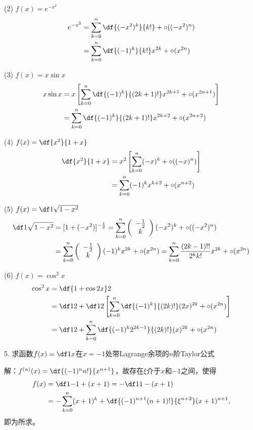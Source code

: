 (2) $f(x)=e^{-x^2}$
\begin{align}
	e^{-x^2}&=\sum\limits_{k=0}^n\df{(-x^2)^k}{k!}+\circ((-x^2)^n)\notag\\
	&=\sum\limits_{k=0}^n\df{(-1)^k}{k!}x^{2k}+\circ(x^{2n})\notag
\end{align}

(3) $f(x)=x\sin x$
\begin{align}
	x\sin x&=x\left[\sum\limits_{k=0}^n\df{(-1)^k}{(2k+1)!}x^{2k+1}
	+\circ(x^{2n+1})\right]\notag\\
	&=\sum\limits_{k=0}^n\df{(-1)^k}{(2k+1)!}x^{2k+2}
	+\circ(x^{2n+2})\notag
\end{align}

(4) $f(x)=\df{x^2}{1+x}$
\begin{align}
	\df{x^2}{1+x}&=x^2\left[\sum\limits_{k=0}^n(-x)^k
	+\circ((-x)^n)\right]\notag\\
	&=\sum\limits_{k=0}^n(-1)^kx^{k+2}+\circ(x^{n+2})\notag
\end{align}

(5) $f(x)=\df1{\sqrt{1-x^2}}$
\begin{align*}
	\df1{\sqrt{1-x^2}}&=[1+(-x^2)]^{-\frac12}
	=\sum\limits_{k=0}^n\left(\begin{array}{c}
	-\frac12 \\ k\end{array}\right)
	(-x^2)^k+\circ((-x^2)^n) \\
	&=\sum\limits_{k=0}^n\left(\begin{array}{c}
	-\frac12 \\ k\end{array}\right)
	(-1)^kx^{2k}+\circ(x^{2n})
	=\sum\limits_{k=0}^n\frac{(2k-1)!!}{2^kk!}x^{2k}
	+\circ(x^{2n})
\end{align*}

(6) $f(x)=\cos^2x$
\begin{align}
	\cos^2x&=\df{1+\cos2x}2\notag\\
	&=\df12+\df12\left[\sum\limits_{k=0}^n\df{(-1)^k}{(2k)!}(2x)^{2k}
	+\circ(x^{2n})\right]\notag\\
	&=\df12+\sum\limits_{k=0}^n\df{(-1)^k2^{2k-1}}{(2k)!}(x)^{2k}
	+\circ(x^{2n})\notag
\end{align}

\bigskip

5. 求函数$f(x)=\df1x$在$x=-1$处带Lagrange余项的$n$阶Taylor公式

解：$f^{(n)}(x)=\df{(-1)^nn!}{x^{n+1}}$，故存在$\xi$介于$x$和$-1$之间，使得
\begin{align}
	f(x)&=\df1{-1+(x+1)}=-\df1{1-(x+1)}\notag\\
	&=-\sum\limits_{k=0}^n(x+1)^k
	+\df{(-1)^{n+1}(n+1)!}{\xi^{n+2}}(x+1)^{n+1},\notag
\end{align}
即为所求。

